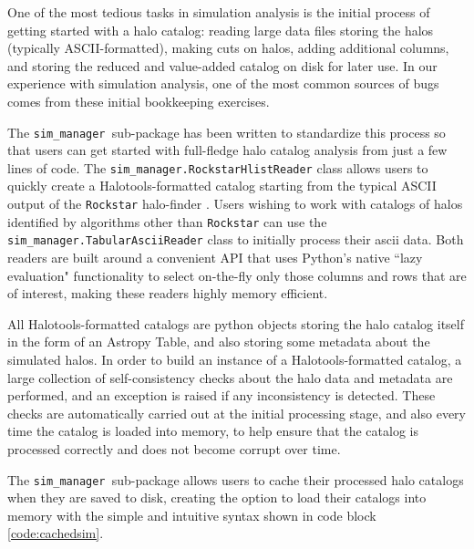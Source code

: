 \documentclass[twocolumn, tighten]{aastex6}
\newcommand{\sims}{{\tt sim\_manager }}
\begin{document}
One of the most tedious tasks in simulation analysis is the initial process of getting started with a halo catalog: reading large data files storing the halos (typically ASCII-formatted), making cuts on halos, adding additional columns, and storing the reduced and value-added catalog on disk for later use. In our experience with simulation analysis, one of the most common sources of bugs comes from these initial bookkeeping exercises. 



The \sims sub-package has been written to standardize this process so that users can get started with full-fledge halo catalog analysis from just a few lines of code. The {\tt sim\_manager.RockstarHlistReader} class allows users to quickly create a Halotools-formatted catalog starting from the typical ASCII output of the {\tt Rockstar} halo-finder \citep{behroozi_rockstar11, rockstar_trees}. Users wishing to work with catalogs of halos identified by algorithms other than {\tt Rockstar} can use the {\tt sim\_manager.TabularAsciiReader} class to initially process their ascii data. Both readers are built around a convenient API that uses Python's native ``lazy evaluation" functionality to select on-the-fly only those columns and rows that are of interest, making these readers highly memory efficient. 

All Halotools-formatted catalogs are python objects storing the halo catalog itself in the form of an Astropy Table, and also storing some metadata about the simulated halos. In order to build an instance of a Halotools-formatted catalog, a large collection of self-consistency checks about the halo data and metadata are performed, and an exception is raised if any inconsistency is detected. These checks are automatically carried out at the initial processing stage, and also every time the catalog is loaded into memory, to help ensure that the catalog is processed correctly and does not become corrupt over time. 

The \sims sub-package allows users to cache their processed halo catalogs when they are saved to disk, creating the option to load their catalogs into memory with the simple and intuitive syntax shown in code block \ref{code:cachedsim}. 
\end{document}
